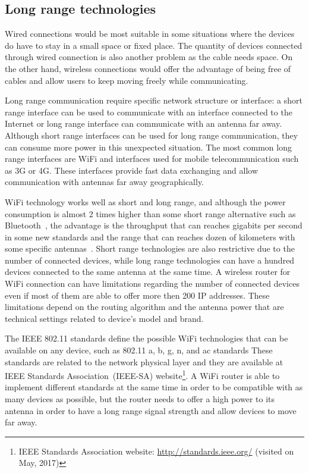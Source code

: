 \subsection*{Long range technologies} 

Wired connections would be most suitable in some situations where the devices do have to stay in a small space or fixed place.
The quantity of devices connected through wired connection is also another problem as the cable needs space.
On the other hand, wireless connections would offer the advantage of being free of cables and allow users to keep moving freely while communicating.

Long range communication require specific network structure or interface: a short range interface can be used to communicate with an interface connected to the Internet or long range interface can communicate with an antenna far away.
Although short range interfaces can be used for long range communication, they can consume more power in this unexpected situation.
The most common long range interfaces are WiFi and interfaces used for mobile telecommunication such as 3G or 4G.
These interfaces provide fast data exchanging and allow communication with antennas far away geographically. 

WiFi technology works well as short and long range, and although the power consumption is almost 2 times higher than some short range alternative such as Bluetooth~\citep{Friedman2013wifibluetooth}, the advantage is the throughput that can reaches gigabits per second in some new standards and the range that can reaches dozen of kilometers with some specific antennas~\citep{Raman2007Experienceswifiindia}.
Short range technologies are also restrictive due to the number of connected devices, while long range technologies can have a hundred devices connected to the same antenna at the same time.
A wireless router for WiFi connection can have limitations regarding the number of connected devices even if most of them are able to offer more then 200 IP addresses.
These limitations depend on the routing algorithm and the antenna power that are technical settings related to device's model and brand.

The IEEE 802.11 standards define the possible WiFi technologies that can be available on any device, such as 802.11 a, b, g, n, and ac standards
These standards are related to the network physical layer and they are available at IEEE Standards Association~(IEEE-SA) website\footnote{IEEE Standards Association website: \url{http://standards.ieee.org/} (visited on May, 2017)}.
A WiFi router is able to implement different standards at the same time in order to be compatible with as many devices as possible, but the router needs to offer a high power to its antenna in order to have a long range signal strength and allow devices to move far away.

